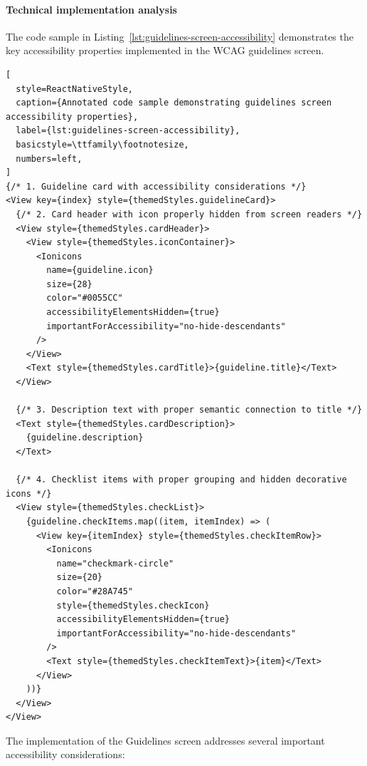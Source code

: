 \paragraph{Technical implementation analysis}

The code sample in Listing~\ref{lst:guidelines-screen-accessibility} demonstrates the key accessibility properties implemented in the WCAG guidelines screen.

\begin{lstlisting}[
  style=ReactNativeStyle,
  caption={Annotated code sample demonstrating guidelines screen accessibility properties},
  label={lst:guidelines-screen-accessibility},
  basicstyle=\ttfamily\footnotesize,
  numbers=left,
]
{/* 1. Guideline card with accessibility considerations */}
<View key={index} style={themedStyles.guidelineCard}>
  {/* 2. Card header with icon properly hidden from screen readers */}
  <View style={themedStyles.cardHeader}>
    <View style={themedStyles.iconContainer}>
      <Ionicons
        name={guideline.icon}
        size={28}
        color="#0055CC"
        accessibilityElementsHidden={true}
        importantForAccessibility="no-hide-descendants"
      />
    </View>
    <Text style={themedStyles.cardTitle}>{guideline.title}</Text>
  </View>

  {/* 3. Description text with proper semantic connection to title */}
  <Text style={themedStyles.cardDescription}>
    {guideline.description}
  </Text>

  {/* 4. Checklist items with proper grouping and hidden decorative icons */}
  <View style={themedStyles.checkList}>
    {guideline.checkItems.map((item, itemIndex) => (
      <View key={itemIndex} style={themedStyles.checkItemRow}>
        <Ionicons
          name="checkmark-circle"
          size={20}
          color="#28A745"
          style={themedStyles.checkIcon}
          accessibilityElementsHidden={true}
          importantForAccessibility="no-hide-descendants"
        />
        <Text style={themedStyles.checkItemText}>{item}</Text>
      </View>
    ))}
  </View>
</View>
\end{lstlisting}

The implementation of the Guidelines screen addresses several important accessibility considerations:

